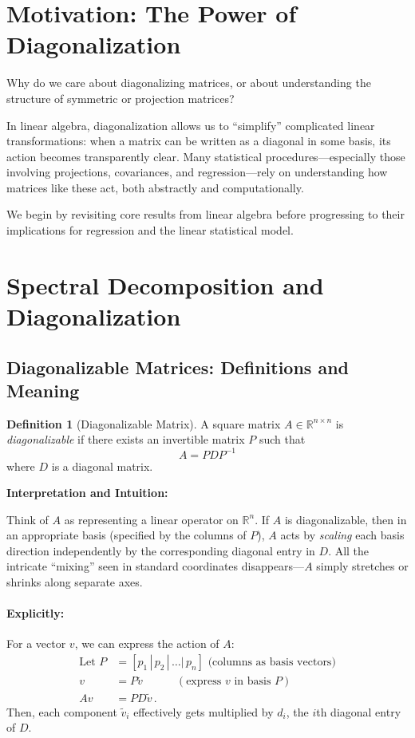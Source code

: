 \documentclass[11pt]{article}
\theoremstyle{definition}
\newtheorem{definition}{Definition}[section]
\theoremstyle{plain}
\theoremstyle{definition}
\begin{document}
\vspace{2em}

\section{Motivation: The Power of Diagonalization}

Why do we care about diagonalizing matrices, or about understanding the structure of symmetric or projection matrices?

In linear algebra, diagonalization allows us to ``simplify'' complicated linear transformations: when a matrix can be written as a diagonal in some basis, its action becomes transparently clear. Many statistical procedures—especially those involving projections, covariances, and regression—rely on understanding how matrices like these act, both abstractly and computationally.

We begin by revisiting core results from linear algebra before progressing to their implications for regression and the linear statistical model.

\section{Spectral Decomposition and Diagonalization}

\subsection{Diagonalizable Matrices: Definitions and Meaning}

\begin{definition}[Diagonalizable Matrix]
A square matrix $A \in \mathbb{R}^{n\times n}$ is \emph{diagonalizable} if there exists an invertible matrix $P$ such that
\[
A = P D P^{-1}
\]
where $D$ is a diagonal matrix.
\end{definition}

\textbf{Interpretation and Intuition:}

Think of $A$ as representing a linear operator on $\mathbb{R}^n$. If $A$ is diagonalizable, then in an appropriate basis (specified by the columns of $P$), $A$ acts by \textit{scaling} each basis direction independently by the corresponding diagonal entry in $D$. All the intricate ``mixing'' seen in standard coordinates disappears—$A$ simply stretches or shrinks along separate axes.

\paragraph{Explicitly:} For a vector $v$, we can express the action of $A$:
\begin{align*}
\text{Let } P &= [p_1\,|\,p_2\,|\,\dots|\,p_n] \text{ (columns as basis vectors)} \\
v &= P \tilde{v} \qquad\quad (\text{express $v$ in basis $P$}) \\
A v &= P D \tilde{v}\,.
\end{align*}
Then, each component $\tilde{v}_i$ effectively gets multiplied by $d_i$, the $i$th diagonal entry of $D$.
\end{document}

